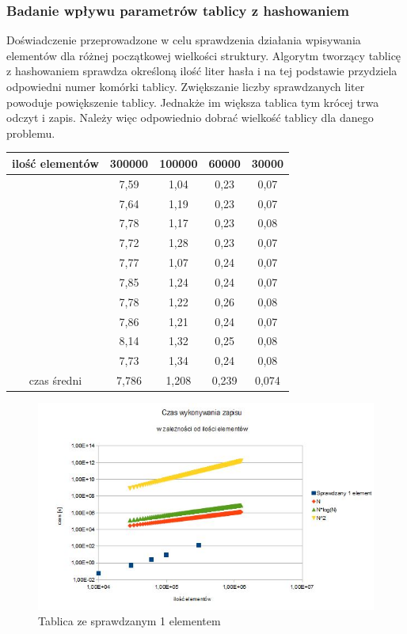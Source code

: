 \documentclass[12pt,a4paper,titlepage]{article}
\begin{document}
\subsubsection{Badanie wpływu parametrów tablicy z hashowaniem}
Doświadczenie przeprowadzone w celu sprawdzenia działania wpisywania elementów dla różnej początkowej wielkości struktury. Algorytm tworzący tablicę z hashowaniem sprawdza określoną ilość liter hasła i na tej podstawie przydziela odpowiedni numer komórki tablicy. Zwiększanie liczby sprawdzanych liter powoduje powiększenie tablicy. Jednakże im większa tablica tym krócej trwa odczyt i zapis. Należy więc odpowiednio dobrać wielkość tablicy dla danego problemu.  

\begin{center}
\begin {tabular}{|c|c|c|c|c|}\hline
ilość elementów&300000&100000&60000&30000\\\hline
&7,59&1,04&0,23&0,07\\\hline
&7,64&1,19&0,23&0,07\\\hline
&7,78&1,17&0,23&0,08\\\hline
&7,72&1,28&0,23&0,07\\\hline
&7,77&1,07&0,24&0,07\\\hline
&7,85&1,24&0,24&0,07\\\hline
&7,78&1,22&0,26&0,08\\\hline
&7,86&1,21&0,24&0,07\\\hline
&8,14&1,32&0,25&0,08\\\hline
&7,73&1,34&0,24&0,08\\\hline
czas średni&7,786&1,208&0,239&0,074\\\hline

\end{tabular}
\end {center}


\begin{figure}[h]
\begin{center}
\includegraphics[scale=0.7]{1_element.jpg}
\caption{Tablica ze sprawdzanym 1 elementem}
\end{center}
\end{figure}
\end{document}
